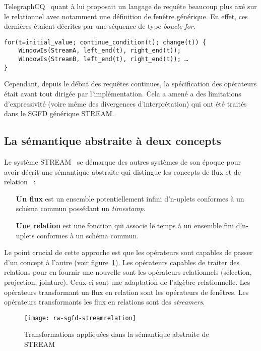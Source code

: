 TelegraphCQ~\cite{Chandrasekaran:telegraphcq} quant à lui proposait un langage de requête beaucoup plus axé sur le relationnel avec notamment une définition de fenêtre générique. En effet, ces dernières étaient décrites par une séquence de type \textit{boucle for}.
\begin{center}
\begin{minipage}[c]{0.75\textwidth}
\begin{verbatim}
for(t=initial_value; continue_condition(t); change(t)) {
    WindowIs(StreamA, left_end(t), right_end(t));
    WindowIs(StreamB, left_end(t), right_end(t)); …
}
\end{verbatim}
\end{minipage}
\end{center}

Cependant, depuis le début des requêtes continues, la spécification des opérateurs était avant tout dirigée par l'implémentation. Cela a amené a des limitations d'expressivité (voire même des divergences d'interprétation) qui ont été traités dans le SGFD générique STREAM.

\subsection{La sémantique abstraite à deux concepts}\label{sec:rw:sgfd:modeles:stream}
Le système STREAM~\cite{Widom:queries, Arasu:stream} se démarque des autres systèmes de son époque pour avoir décrit une sémantique abstraite qui distingue les concepts de flux et de relation~\cite{Arasu:semantic} :
\begin{itemize}
 \item[\textbf{Un flux}] est un ensemble potentiellement infini d'n-uplets conformes à un schéma commun possédant un \textit{timestamp}.
 \item[\textbf{Une relation}] est une fonction qui associe le temps à un ensemble fini d'n-uplets conformes à un schéma commun.
\end{itemize}
Le point crucial de cette approche est que les opérateurs sont capables de passer d'un concept à l'autre (voir figure~\ref{fig:rw:sgfd:streamrelation}). Les opérateurs capables de traiter des relations pour en fournir une nouvelle sont les opérateurs relationnels (sélection, projection, jointure). Ceux-ci sont une adaptation de l'algèbre relationnelle. Les opérateurs transformant un flux en relation sont les opérateurs de fenêtres. Les opérateurs transformants les flux en relations sont des \textit{streamers}.
\begin{figure}[ht]
    \centering
    \texttt{[image: rw-sgfd-streamrelation]}
    \caption{Transformations appliquées dans la sémantique abstraite de STREAM}\label{fig:rw:sgfd:streamrelation}
\end{figure}

